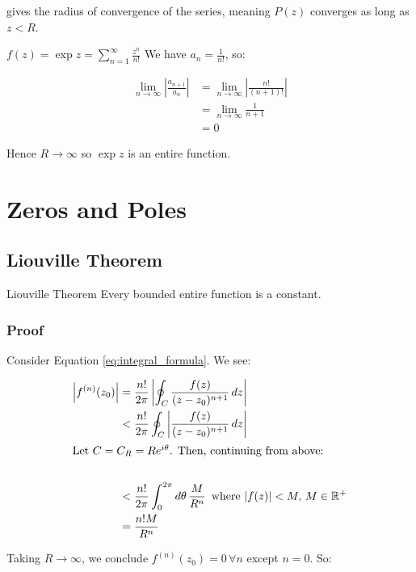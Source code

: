 \documentclass{../../physics_notes}
\begin{document}
gives the radius of convergence of the series, meaning $P(z)$ converges as long as $z < R$.

\begin{example}{$f(z) = \exp{z} = \sum_{n=1}^\infty \frac{z^n}{n!}$}
We have $a_n = \frac{1}{n!}$, so:

\begin{align*} 
\lim_{n\to\infty} \left|\frac{a_{n+1}}{a_n}\right| &= \lim_{n\to\infty} \left|\frac{n!}{(n+1)!}\right| \\
&= \lim_{n\to\infty} \frac{1}{n+1} \\
&= 0
\end{align*}

Hence $R \longrightarrow \infty$ so $\exp{z}$ is an entire function.
\end{example}

\section{Zeros and Poles}
\subsection{Liouville Theorem}

\begin{theorem}{Liouville Theorem}
Every bounded entire function is a constant.
\end{theorem}

\subsubsection*{Proof}

Consider Equation \ref{eq:integral_formula}. We see:

\begin{align*}
\left|f^{(n)}(z_0)\right| &= \frac{n!}{2\pi}\left|\oint_C \frac{f(z)}{(z-z_0)^{n+1}}\, dz\right| \\
&< \frac{n!}{2\pi}\oint_C \left| \frac{f(z)}{(z-z_0)^{n+1}}\, dz\right| \\
\intertext{Let $C = C_R = Re^{i\theta}$. Then, continuing from above:} \\
&< \frac{n!}{2\pi}\int_0^{2\pi} d\theta \, \frac{M}{R^n} \, \text{ where $|f(z)| < M, \, M\in \mathbb{R}^{+}$} \\
&= \frac{n!M}{R^n}
\end{align*}

Taking $R\to\infty$, we conclude $f^{(n)}(z_0) = 0 \, \forall n$ except $n=0$. So:
\end{document}
